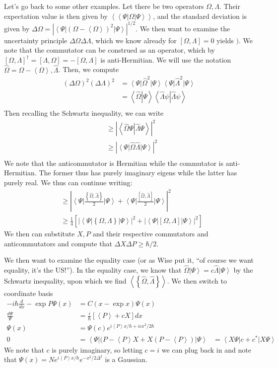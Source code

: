 \documentclass[10pt]{report}
\newcommand{\bra}[1]{\left<#1\right|}
\newcommand{\ket}[1]{\left|#1\right>}
\newcommand{\dotp}[2]{\left<#1\left.\right|#2\right>}
\newcommand{\rd}[2]{\frac{d#1}{d#2}}
\newcommand{\abs}[1]{\left|#1\right|}
\newcommand{\expvalue}[1]{\left<#1\right>}
\begin{document}
Let's go back to some other examples. Let there be two operators $\Omega,\Lambda$. Their expectation value is then given by $\expvalue{\bra{\Psi}\Omega\ket{\Psi}}$, and the standard deviation is given by $\Delta \Omega = \abs{\bra{\Psi}\left( \Omega - \expvalue{\Omega} \right)^2\ket{\Psi}} ^ {1/2}$. We then want to examine the uncertainty principle $\Delta \Omega \Delta \Lambda$, which we know already for $[\Omega,\Lambda] = 0$ yields $)$. We note that the commutator can be construed as an operator, which by $[\Omega,\Lambda]^\dagger = [\Lambda,\Omega] = -[\Omega,\Lambda]$ is anti-Hermitian. We will use the notation $\hat{\Omega} = \Omega - \expvalue{\Omega}, \hat{\Lambda}$. Then, we compute
\begin{align}
	(\Delta\Omega)^2(\Delta\Lambda)^2 &= \bra{\Psi}\hat{\Omega}^2\ket{\Psi}\bra{\Psi}\hat{\Lambda}^2\ket{\Psi}\\
	&=\dotp{\hat{\Omega}}{\Psi}\dotp{\hat{\Lambda}\psi}{\hat{\Lambda}\psi}\\
\end{align}
Then recalling the Schwartz inequality, we can write
\begin{align}
	&\geq \abs{\dotp{\hat{\Omega}\Psi}{\hat{\Lambda}\Psi}}^2\\
	&\geq \abs{\bra{\Psi}\hat{\Omega}\hat{\Lambda}\ket{\Psi}}^2\\
\end{align}
We note that the anticommutator is Hermitian while the commutator is anti-Hermitian. The former thus has purely imaginary eigens while the latter has purely real. We thus can continue writing:
\begin{align}
	&\geq \abs{\bra{\Psi}\frac{\left\{ \hat{\Omega},\hat{\Lambda} \right\}}{2}\ket{\Psi} + \bra{\Psi}\frac{\left[ \hat{\Omega},\hat{\Lambda} \right]}{2}\ket{\Psi}}^2\\
	&\geq \frac{1}{4}\left[ \abs{\bra{\Psi}\left\{ \Omega,\Lambda \right\}\ket{\Psi}}^2 +  \abs{\bra{\Psi}\left[ \Omega,\Lambda \right]\ket{\Psi}}^2\right]
\end{align}
We then can substitute $X,P$ and their respective commutators and anticommutators and compute that $\Delta X \Delta P \geq \hbar/2$. 

We then want to examine the equality case (or as Wise put it, ``of course we want equality, it's the US!''). In the equality case, we know that $\hat{\Omega}\ket{\Psi} = c\hat{\Lambda}\ket{\Psi}$ by the Schwartz inequality, upon which we find $\expvalue{ \left\{ \hat{\Omega},\hat{\Lambda} \right\}}$. We then switch to coordinate basis
\begin{align}
	-i\hbar \rd{}{x}-\exp{P} \Psi(x) &= C(x-\exp{x})\Psi(x)\\
	\frac{d\Psi}{\Psi} &= \frac{i}{\hbar}\left[ \expvalue{P} +cX\right] dx\\
	\Psi(x) &= \Psi(c) e^{i\expvalue{P}x/\hbar + icx^2/2\hbar}\\
	0 &= \bra{\Psi}(P-\expvalue{P}X + X(P-\expvalue{P})\ket{\Psi}
	&= \bra{X\Psi}c+c^*\ket{X\Psi}
\end{align}
We note that $c$ is purely imaginary, so letting $c=i$ we can plug back in and note that $\Psi(x)=Ne^{i\expvalue{P}x/\hbar}e^{-x^2/2\Delta^2}$ is a Gaussian.
\end{document}

